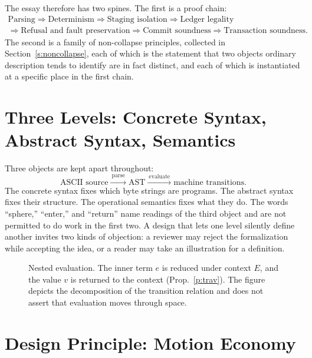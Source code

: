 \documentclass[11pt]{article}
\begin{document}
The essay therefore has two spines. The first is a proof chain:
\begin{gather*}
\text{Parsing}\Rightarrow\text{Determinism}\Rightarrow\text{Staging isolation}\Rightarrow\text{Ledger legality}\\
\Rightarrow\text{Refusal and fault preservation}\Rightarrow\text{Commit soundness}\Rightarrow\text{Transaction soundness}.
\end{gather*}
The second is a family of non-collapse principles, collected in Section~\ref{s:noncollapse}, each of which is the statement that two objects ordinary description tends to identify are in fact distinct, and each of which is instantiated at a specific place in the first chain.

\section{Three Levels: Concrete Syntax, Abstract Syntax, Semantics}

Three objects are kept apart throughout:
\[
\text{ASCII source}\xrightarrow{\ \mathrm{parse}\ }\text{AST}\xrightarrow{\ \mathrm{evaluate}\ }\text{machine transitions}.
\]
The concrete syntax fixes which byte strings are programs. The abstract syntax fixes their structure. The operational semantics fixes what they do. The words ``sphere,'' ``enter,'' and ``return'' name readings of the third object and are not permitted to do work in the first two. A design that lets one level silently define another invites two kinds of objection: a reviewer may reject the formalization while accepting the idea, or a reader may take an illustration for a definition.

\begin{figure}[h]
\centering
{}
\caption{Nested evaluation. The inner term $e$ is reduced under context $E$, and the value $v$ is returned to the context (Prop.~\ref{p:trav}). The figure depicts the decomposition of the transition relation and does not assert that evaluation moves through space.}
\end{figure}

\section{Design Principle: Motion Economy}
\end{document}
